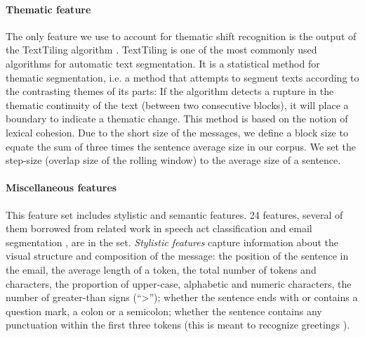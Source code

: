 
\paragraph{Thematic feature}
%
The only feature we use to account for thematic shift recognition is the output of the TextTiling algorithm \cite{hearst1997texttiling}. TextTiling is one of the most commonly used algorithms for automatic text segmentation. 
It is a statistical method for thematic segmentation, i.e. a method that attempts to segment texts according to the contrasting themes of its parts: 
If the algorithm detects a rupture in the thematic continuity 
of the text (between two consecutive blocks), it will place a boundary to indicate a thematic change. This method is based on the notion of lexical cohesion.
%
Due to the short size of the messages, we define a block size to equate the sum of three times the sentence average size in our corpus. We set the step-size (overlap size of the rolling window) to the average size of a sentence.

\paragraph{Miscellaneous features}
%
This feature set includes stylistic %
and semantic features. 24 features, several of them borrowed from related work in speech act classification \cite{qadir2011classifying} and email segmentation \cite{lampert2009segmenting}, are in the set.
\linebreak
%
\textit{Stylistic features} capture information about the visual structure and composition of the message:
the position of the sentence in the email, 
the average length of a token,
the total number of tokens and characters, 
the proportion of upper-case, alphabetic and numeric characters,
the number of greater-than signs (``>''); %
whether the sentence ends with or contains a question mark, a colon or a semicolon; %
whether the sentence contains any punctuation within the first three tokens (this is meant to recognize greetings \cite{qadir2011classifying}).

